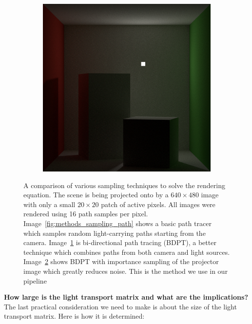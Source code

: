\begin{figure}[]
\begin{subfigure}[b]{0.32\textwidth}
        \caption{}
        \label{fig:methods_sampling_bdpt}
    \end{subfigure}
    \hfill
    \begin{subfigure}[b]{0.32\textwidth}
        \centering
        \includegraphics[width=\textwidth]{images/03-sampling_bdpt_importance.jpg}
        \caption{}
        \label{fig:methods_sampling_bdpt_importance}
    \end{subfigure}
    \caption{A comparison of various sampling techniques to solve the rendering equation. The scene is being projected onto by a \(640 \times 480\) image with only a small \(20 \times 20\) patch of active pixels. All images were rendered using 16 path samples per pixel. Image~\ref{fig:methods_sampling_path} shows a basic path tracer which samples random light-carrying paths starting from the camera. Image~\ref{fig:methods_sampling_bdpt} is bi-directional path tracing (BDPT), a better technique which combines paths from both camera and light sources. Image~\ref{fig:methods_sampling_bdpt_importance} shows BDPT with importance sampling of the projector image which greatly reduces noise. This is the method we use in our pipeline}
    \label{fig:methods_sampling}
\end{figure}

\textbf{How large is the light transport matrix and what are the implications?} The last practical consideration we need to make is about the size of the light transport matrix. Here is how it is determined:

